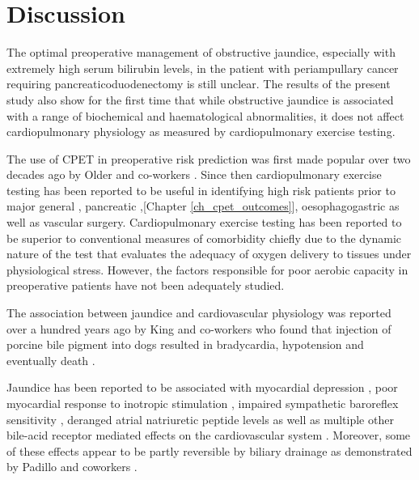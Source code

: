 \clearpage

\section{Discussion}
The optimal preoperative management of obstructive jaundice, especially with extremely high serum bilirubin levels, in the patient with periampullary cancer requiring pancreaticoduodenectomy is still unclear. The results of the present study also show for the first time that while obstructive jaundice is associated with a range of biochemical and haematological abnormalities, it does not affect cardiopulmonary physiology as measured by cardiopulmonary exercise testing. 

The use of CPET in preoperative risk prediction was first made popular over two decades ago by Older and co-workers \parencite{older_preoperative_1993}. Since then cardiopulmonary exercise testing has been reported to be useful in identifying high risk patients prior to major general \parencite{snowden_submaximal_2010}, pancreatic \parencite{ausania_effects_2012},[Chapter \ref{ch_cpet_outcomes}], oesophagogastric \parencite{nagamatsu_preoperative_2001} as well as vascular \parencite{carlisle_mid-term_2007} surgery. Cardiopulmonary exercise testing has been reported to be superior to conventional measures of comorbidity chiefly due to the dynamic nature of the test that evaluates the adequacy of oxygen delivery to tissues under physiological stress. However, the factors responsible for poor aerobic capacity in preoperative patients have not been adequately studied.

The association between jaundice and cardiovascular physiology was reported over a hundred years ago by King and co-workers who found that injection of porcine bile pigment into dogs resulted in bradycardia, hypotension and eventually death \parencite{king_effect_1909}.

Jaundice has been reported to be associated with myocardial depression \parencite{green_jaundiced_1986}, poor myocardial response to inotropic stimulation \parencite{lumlertgul_jaundiced_1991}, impaired sympathetic baroreflex sensitivity \parencite{song_baroreflex_2009}, deranged atrial natriuretic peptide levels \parencite{pereira_increased_1994,gallardo_increased_1998} as well as multiple other bile-acid receptor mediated effects on the cardiovascular system \parencite{khurana_bile_2011}. Moreover, some of these effects appear to be partly reversible by biliary drainage as demonstrated by Padillo and coworkers \parencite{padillo_improved_2001}.

